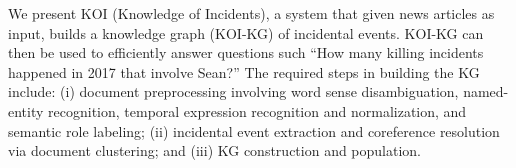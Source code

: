 We present KOI (Knowledge of Incidents), a system that given news articles as input, builds a knowledge graph (KOI-KG) of incidental events. KOI-KG can then be used to efficiently answer questions such ``How many killing incidents happened in 2017 that involve Sean?'' The required steps in building the KG include: (i) document preprocessing involving word sense disambiguation, named-entity recognition, temporal expression recognition and normalization, and semantic role labeling; (ii) incidental event extraction and coreference resolution via document clustering; and (iii) KG construction and population.
